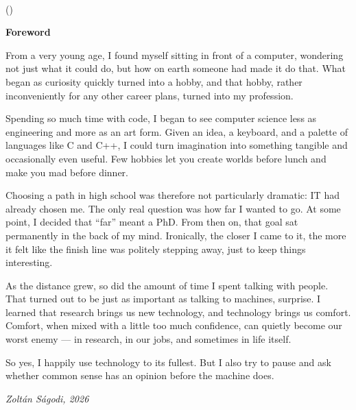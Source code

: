 

\thispagestyle{empty}
\vspace{4em}
\begin{flushright}
	\parbox[t]{10cm}{\selectedquote} \\
	\vspace{1em}
	\parbox[t]{5cm}{\raggedleft\small(\theguy)}
\end{flushright}


\vspace*{4em}
{\Huge \textbf{Foreword}}
\vspace{2em}

From a very young age, I found myself sitting in front of a computer, wondering not just what it could do, but how on earth someone had made it do that.
What began as curiosity quickly turned into a hobby, and that hobby, rather inconveniently for any other career plans, turned into my profession.

Spending so much time with code, I began to see computer science less as engineering and more as an art form.
Given an idea, a keyboard, and a palette of languages like C and C++, I could turn imagination into something tangible and occasionally even useful.
Few hobbies let you create worlds before lunch and make you mad before dinner.

Choosing a path in high school was therefore not particularly dramatic: IT had already chosen me.
The only real question was how far I wanted to go.
At some point, I decided that “far” meant a PhD.
From then on, that goal sat permanently in the back of my mind.
Ironically, the closer I came to it, the more it felt like the finish line was politely stepping away, just to keep things interesting.

As the distance grew, so did the amount of time I spent talking with people.
That turned out to be just as important as talking to machines, surprise.
I learned that research brings us new technology, and technology brings us comfort.
Comfort, when mixed with a little too much confidence, can quietly become our worst enemy — in research, in our jobs, and sometimes in life itself.

So yes, I happily use technology to its fullest.
But I also try to pause and ask whether common sense has an opinion before the machine does.

\vspace*{3em}
\textit{Zoltán Ságodi, 2026}